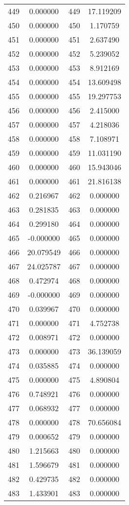 \documentclass[12pt]{article}
\begin{document}
\begin{longtable}{@{}cccc@{}}
449 & 0.000000 & 449 & 17.119209 \\
450 & 0.000000 & 450 & 1.170759 \\
451 & 0.000000 & 451 & 2.637490 \\
452 & 0.000000 & 452 & 5.239052 \\
453 & 0.000000 & 453 & 8.912169 \\
454 & 0.000000 & 454 & 13.609498 \\
455 & 0.000000 & 455 & 19.297753 \\
456 & 0.000000 & 456 & 2.415000 \\
457 & 0.000000 & 457 & 4.218036 \\
458 & 0.000000 & 458 & 7.108971 \\
459 & 0.000000 & 459 & 11.031190 \\
460 & 0.000000 & 460 & 15.943046 \\
461 & 0.000000 & 461 & 21.816138 \\
462 & 0.216967 & 462 & 0.000000 \\
463 & 0.281835 & 463 & 0.000000 \\
464 & 0.299180 & 464 & 0.000000 \\
465 & -0.000000 & 465 & 0.000000 \\
466 & 20.079549 & 466 & 0.000000 \\
467 & 24.025787 & 467 & 0.000000 \\
468 & 0.472974 & 468 & 0.000000 \\
469 & -0.000000 & 469 & 0.000000 \\
470 & 0.039967 & 470 & 0.000000 \\
471 & 0.000000 & 471 & 4.752738 \\
472 & 0.008971 & 472 & 0.000000 \\
473 & 0.000000 & 473 & 36.139059 \\
474 & 0.035885 & 474 & 0.000000 \\
475 & 0.000000 & 475 & 4.890804 \\
476 & 0.748921 & 476 & 0.000000 \\
477 & 0.068932 & 477 & 0.000000 \\
478 & 0.000000 & 478 & 70.656084 \\
479 & 0.000652 & 479 & 0.000000 \\
480 & 1.215663 & 480 & 0.000000 \\
481 & 1.596679 & 481 & 0.000000 \\
482 & 0.429735 & 482 & 0.000000 \\
483 & 1.433901 & 483 & 0.000000 \\

\end{longtable}
\end{document}
